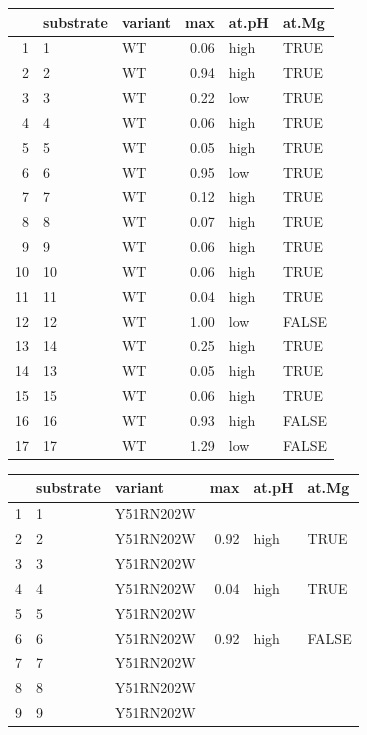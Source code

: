 \documentclass[]{tufte-handout}
\begin{document}
\begin{table}[ht]
\centering
\begin{tabular}{rllrll}
  \toprule
 & substrate & variant & max & at.pH & at.Mg \\ 
  \midrule
1 & 1 & WT & 0.06 & high & TRUE \\ 
  2 & 2 & WT & 0.94 & high & TRUE \\ 
  3 & 3 & WT & 0.22 & low & TRUE \\ 
  4 & 4 & WT & 0.06 & high & TRUE \\ 
  5 & 5 & WT & 0.05 & high & TRUE \\ 
  6 & 6 & WT & 0.95 & low & TRUE \\ 
  7 & 7 & WT & 0.12 & high & TRUE \\ 
  8 & 8 & WT & 0.07 & high & TRUE \\ 
  9 & 9 & WT & 0.06 & high & TRUE \\ 
  10 & 10 & WT & 0.06 & high & TRUE \\ 
  11 & 11 & WT & 0.04 & high & TRUE \\ 
  12 & 12 & WT & 1.00 & low & FALSE \\ 
  13 & 14 & WT & 0.25 & high & TRUE \\ 
  14 & 13 & WT & 0.05 & high & TRUE \\ 
  15 & 15 & WT & 0.06 & high & TRUE \\ 
  16 & 16 & WT & 0.93 & high & FALSE \\ 
  17 & 17 & WT & 1.29 & low & FALSE \\ 
   \bottomrule
\end{tabular}
\end{table}\begin{table}[ht]
\centering
\begin{tabular}{rllrll}
  \toprule
 & substrate & variant & max & at.pH & at.Mg \\ 
  \midrule
1 & 1 & Y51RN202W &  &  &  \\ 
  2 & 2 & Y51RN202W & 0.92 & high & TRUE \\ 
  3 & 3 & Y51RN202W &  &  &  \\ 
  4 & 4 & Y51RN202W & 0.04 & high & TRUE \\ 
  5 & 5 & Y51RN202W &  &  &  \\ 
  6 & 6 & Y51RN202W & 0.92 & high & FALSE \\ 
  7 & 7 & Y51RN202W &  &  &  \\ 
  8 & 8 & Y51RN202W &  &  &  \\ 
  9 & 9 & Y51RN202W &  &  &  \\ 

\end{tabular}
\end{table}
\end{document}
